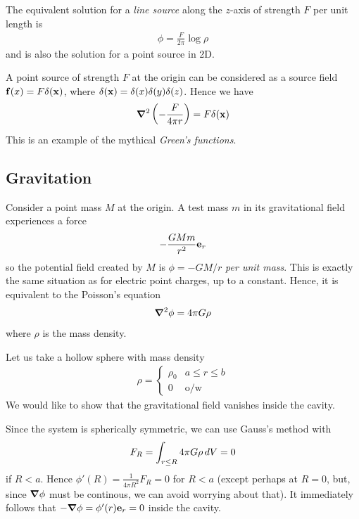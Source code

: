 \documentclass{../template/note}
\begin{document}
    The equivalent solution for a \emph{line source} along the \(z\)-axis of strength \(F\) per unit length is
    \begin{align*}
        \phi = \frac{F}{2\pi} \log \rho
    \end{align*}
    and is also the solution for a point source in 2D.
    
    \begin{remark*}
        A point source of strength \(F\) at the origin can be considered as a source field \(\V f(x) = F \delta(\V x)\), where \(\delta(\V x) = \delta(x)\delta(y)\delta(z)\). Hence we have
        \begin{align*}
            \grad^2 \left(-\frac{F}{4\pi r}\right) = F \delta(\V x)
        \end{align*}
        This is an example of the mythical \emph{Green's functions}.
    \end{remark*}
    
    \subsection{Gravitation}

    Consider a point mass \(M\) at the origin. A test mass \(m\) in its gravitational field experiences a force
    \begin{align*}
        -\frac{GMm}{r^2} \V e_r
    \end{align*}
    so the potential field created by \(M\) is \(\phi = -GM/r\) \emph{per unit mass}. This is exactly the same situation as for electric point charges, up to a constant. Hence, it is equivalent to the Poisson's equation
    \begin{align*}
        \grad^2 \phi = 4\pi G \rho
    \end{align*}
    where \(\rho\) is the mass density.

    \begin{example*}
        Let us take a hollow sphere with mass density
        \begin{align*}
            \rho = \begin{cases}
                \rho_0 & a \leq r \leq b \\
                0 & \text{o/w}
            \end{cases}
        \end{align*}
        We would like to show that the gravitational field vanishes inside the cavity.
    
        Since the system is spherically symmetric, we can use Gauss's method with
        \begin{align*}
            F_R = \int_{r \leq R} 4\pi G \rho \,d{V} = 0
        \end{align*}
        if \(R < a\). Hence \(\phi'(R) = \frac{1}{4\pi R^2}F_R = 0\) for \(R < a\) (except perhaps at \(R=0\), but, since \(\grad \phi\) must be continous, we can avoid worrying about that). It immediately follows that \(-\grad \phi = \phi'(r) \V e_r = 0\) inside the cavity.
    \end{example*}
    
\end{document}
